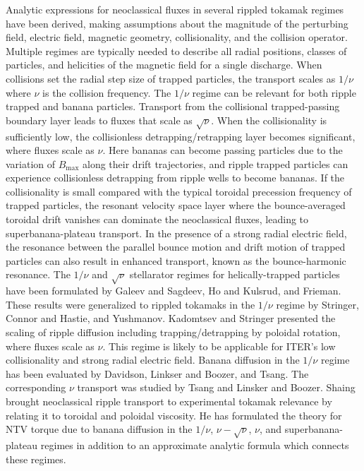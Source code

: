 \documentclass[aip, pop, preprint]{revtex4-1}
\numberwithin{figure}{section}
\numberwithin{equation}{section}
\begin{document}
Analytic expressions for neoclassical fluxes in several rippled tokamak regimes have been derived, making assumptions about the magnitude of the perturbing field, electric field, magnetic geometry, collisionality, and the collision operator. Multiple regimes are typically needed to describe all radial positions, classes of particles, and helicities of the magnetic field for a single discharge. When collisions set the radial step size of trapped particles, the transport scales as $1/\nu$ where $\nu$ is the collision frequency. The $1/\nu$ regime can be relevant for both ripple trapped and banana particles. Transport from the collisional trapped-passing boundary layer leads to fluxes that scale as $\sqrt{\nu}$. When the collisionality is sufficiently low, the collisionless detrapping/retrapping layer becomes significant, where fluxes scale as $\nu$. Here bananas can become passing particles due to the variation of $B_{\max}$ along their drift trajectories,\cite{Shaing2009} and ripple trapped particles can experience collisionless detrapping from ripple wells to become bananas.\cite{Shaing1982a, Shaing1982b} If the collisionality is small compared with the typical toroidal precession frequency of trapped particles, the resonant velocity space layer where the bounce-averaged toroidal drift vanishes can dominate the neoclassical fluxes, leading to superbanana-plateau transport.\cite{Shaing2009_sbp} In the presence of a strong radial electric field, the resonance between the parallel bounce motion and drift motion of trapped particles can also result in enhanced transport, known as the bounce-harmonic resonance.\cite{Linsker1982,Park2009} The $1/\nu$ and $\sqrt{\nu}$ stellarator regimes for helically-trapped particles have been formulated by Galeev and Sagdeev,\cite{Galeev1969} Ho and Kulsrud,\cite{Ho1987} and Frieman.\cite{Frieman1970} These results were generalized to rippled tokamaks in the $1/\nu$ regime by Stringer,\cite{Stringer1972} Connor and Hastie,\cite{Connor1973} and Yushmanov.\cite{Yushmanov1982} Kadomtsev\cite{Kadomtsev1971} and Stringer\cite{Stringer1972} presented the scaling of ripple diffusion including trapping/detrapping by poloidal rotation, where fluxes scale as $\nu$. This regime is likely to be applicable for ITER's low collisionality and strong radial electric field. Banana diffusion in the $1/\nu$ regime has been evaluated by Davidson,\cite{Davidson1976} Linkser and Boozer,\cite{Linsker1982} and Tsang.\cite{Tsang1977} The corresponding $\nu$ transport was studied by Tsang\cite{Tsang1977} and Linsker and Boozer.\cite{Linsker1982} Shaing brought neoclassical ripple transport to experimental tokamak relevance by relating it to toroidal and poloidal viscosity.\cite{Shaing1983} He has formulated the theory for NTV torque due to banana diffusion in the $1/\nu$,\cite{Shaing2003} $\nu-\sqrt{\nu}$,\cite{Shaing2008} $\nu$,\cite{Shaing2009} and superbanana-plateau \cite{Shaing2009_sbp} regimes in addition to an approximate analytic formula which connects these regimes.\cite{Shaing2010}
\end{document}
